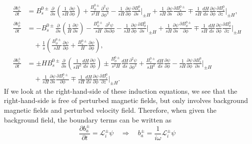\begin{equation}
    \begin{aligned}
        \frac{\partial b_s^\pm}{\partial t} &= B_s^{0\pm} \frac{\partial}{\partial s} \left(\frac{1}{sH}\frac{\partial \psi}{\partial \phi}\right) + \frac{B_\phi^{0\pm}}{s^2 H} \frac{\partial^2 \psi}{\partial \phi^2} - \frac{1}{sH} \frac{\partial \psi}{\partial \phi} \frac{\partial B_s^0}{\partial s}\bigg|_{\pm H} + \frac{1}{sH} \frac{\partial \psi}{\partial s} \frac{\partial B_s^{0\pm}}{\partial \phi} \mp \frac{1}{sH} \frac{dH}{ds}\frac{\partial \psi}{\partial \phi} \frac{\partial B_s^0}{\partial z}\bigg|_{\pm H}, \\ 
        \frac{\partial b_\phi^\pm}{\partial t} &= -B_s^{0\pm} \frac{\partial}{\partial s}\left(\frac{1}{H}\frac{\partial \psi}{\partial s}\right) - \frac{B_\phi^{0\pm}}{sH} \frac{\partial^2 \psi}{\partial s \partial \phi} - \frac{1}{sH} \frac{\partial \psi}{\partial \phi} \frac{\partial B_\phi^0}{\partial s}\bigg|_{\pm H} + \frac{1}{sH} \frac{\partial \psi}{\partial s} \frac{\partial B_\phi^{0\pm}}{\partial \phi} \mp \frac{1}{sH} \frac{dH}{ds}\frac{\partial \psi}{\partial \phi} \frac{\partial B_\phi^0}{\partial z}\bigg|_{\pm H} \\
        &\quad + \frac{1}{s}\left(\frac{B_\phi^{0\pm}}{sH}\frac{\partial \psi}{\partial \phi} + \frac{B_s^{0\pm}}{H}\frac{\partial \psi}{\partial \phi}\right), \\ 
        \frac{\partial b_z^\pm}{\partial t} &= \pm H B_s^{0\pm} \frac{\partial}{\partial s}\left(\frac{1}{sH^2}\frac{dH}{ds}\frac{\partial \psi}{\partial \phi}\right) \pm \frac{B_\phi^{0\pm}}{s^2 H} \frac{dH}{ds} \frac{\partial^2 \psi}{\partial \phi^2} + \frac{B_z^{0\pm}}{sH^2}\frac{dH}{ds}\frac{\partial \psi}{\partial \phi} - \frac{1}{sH}\frac{\partial \psi}{\partial \phi} \frac{\partial B_z^0}{\partial s}\bigg|_{\pm H} \\
        &\quad + \frac{1}{sH} \frac{\partial \psi}{\partial s} \frac{\partial B_z^{0\pm}}{\partial \phi} \mp \frac{1}{sH} \frac{dH}{ds}\frac{\partial \psi}{\partial \phi} \frac{\partial B_z^0}{\partial z}\bigg|_{\pm H}.
    \end{aligned}
\end{equation}
If we look at the right-hand-side of these induction equations, we see that the right-hand-side is free of perturbed magnetic fields, but only involves background magnetic fields and perturbed velocity field. Therefore, when given the background field, the boundary terms can be written as
\[
    \frac{\partial b_a^{\pm}}{\partial t} = \mathcal{L}_i^{\pm} \psi \quad \Longrightarrow \quad b_a^{\pm} = \frac{1}{i\omega} \mathcal{L}_i^\pm \psi
\]
